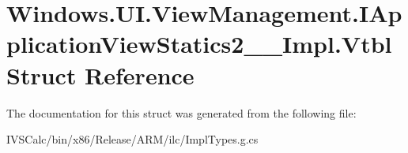 \hypertarget{struct_windows_1_1_u_i_1_1_view_management_1_1_i_application_view_statics2_____impl_1_1_vtbl}{}\section{Windows.\+U\+I.\+View\+Management.\+I\+Application\+View\+Statics2\+\_\+\+\_\+\+Impl.\+Vtbl Struct Reference}
\label{struct_windows_1_1_u_i_1_1_view_management_1_1_i_application_view_statics2_____impl_1_1_vtbl}


The documentation for this struct was generated from the following file\+:\begin{DoxyCompactItemize}
\item 
I\+V\+S\+Calc/bin/x86/\+Release/\+A\+R\+M/ilc/Impl\+Types.\+g.\+cs\end{DoxyCompactItemize}

